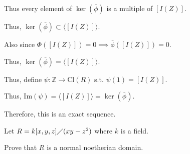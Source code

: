 \documentclass[12pt, letterpaper]{article}
\newcommand{\Z}{\mathbb{Z}}
\begin{document}
\begin{problemproof}
    Thus every element of $\ker(\bar{\phi})$ is a multiple of $[I(Z)]$.

    Thus, $\ker(\bar{\phi}) \subset \langle [I(Z)] \rangle$.

    Also since $\Phi([I(Z)]) = 0 \implies \bar{\phi}([I(Z)]) = 0$.

    Thus, $\ker(\bar{\phi}) = \langle [I(Z)] \rangle$.

    Thus, define $\psi : \Z \to \mathrm{Cl}(R)$ s.t. $\psi(1)=[I(Z)]$.

    Thus, $\mathrm{Im}(\psi) =\langle [I(Z)] \rangle =  \ker(\bar{\phi})$.

    Therefore, this is an exact sequence.
\end{problemproof}

\begin{problem}{}
    Let $R = k[x,y,z] \diagup (xy-z^2)$ where $k$ is a field.
\end{problem}
\begin{subproblem}{}
    Prove that $R$ is a normal noetherian domain.
\end{subproblem}
\end{document}
